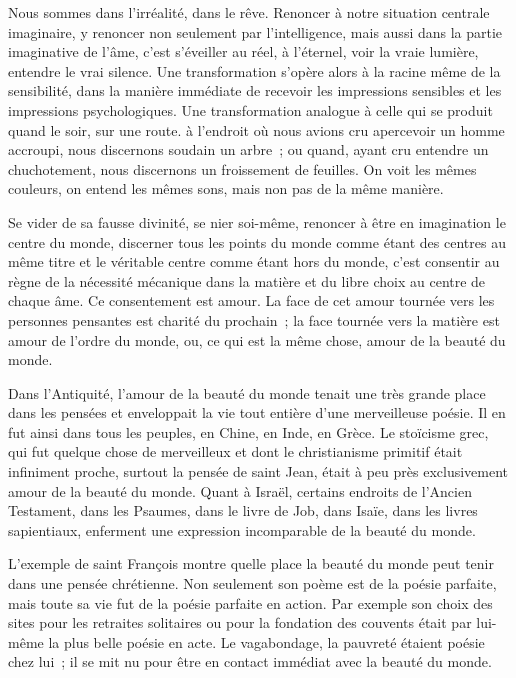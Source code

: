 \documentclass[french,twoside]{book} %
\begin{document}
Nous sommes dans l'irréalité, dans le rêve. Renoncer à notre situation centrale imaginaire, y renoncer non seulement par l'intelligence, mais aussi dans la partie imaginative de l'âme, c'est s'éveiller au réel, à l'éternel, voir la vraie lumière, entendre le vrai silence. Une transformation s'opère alors à la racine même de la sensibilité, dans la manière immédiate de recevoir les impressions sensibles et les impressions psychologiques. Une transformation analogue à celle qui se produit quand le soir, sur une route. à l'endroit où nous avions cru apercevoir un homme accroupi, nous discernons soudain un arbre ; ou quand, ayant cru entendre un chuchotement, nous discernons un froissement de feuilles. On voit les mêmes couleurs, on entend les mêmes sons, mais non pas de la même manière.\par
Se vider de sa fausse divinité, se nier soi-même, renoncer à être en imagination le centre du monde, discerner tous les points du monde comme étant des centres au même titre et le véritable centre comme étant hors du monde, c'est consentir au règne de la nécessité mécanique dans la matière et du libre choix au centre de chaque âme. Ce consentement est amour. La face de cet amour tournée vers les personnes pensantes est charité du prochain ; la face tournée vers la matière est amour de l'ordre du monde, ou, ce qui est la même chose, amour de la beauté du monde.\par
Dans l'Antiquité, l'amour de la beauté du monde tenait une très grande place dans les pensées et enveloppait la vie tout entière d'une merveilleuse poésie. Il en fut ainsi dans tous les peuples, en Chine, en Inde, en Grèce. Le stoïcisme grec, qui fut quelque chose de merveilleux et dont le christianisme primitif était infiniment proche, surtout la pensée de saint Jean, était à peu près exclusivement amour de la beauté du monde. Quant à Israël, certains endroits de l'Ancien Testament, dans les Psaumes, dans le livre de Job, dans Isaïe, dans les livres sapientiaux, enferment une expression incomparable de la beauté du monde.\par
L'exemple de saint François montre quelle place la beauté du monde peut tenir dans une pensée chrétienne. Non seulement son poème est de la poésie parfaite, mais toute sa vie fut de la poésie parfaite en action. Par exemple son choix des sites pour les retraites solitaires ou pour la fondation des couvents était par lui-même la plus belle poésie en acte. Le vagabondage, la pauvreté étaient poésie chez lui ; il se mit nu pour être en contact immédiat avec la beauté du monde.\par
\end{document}
